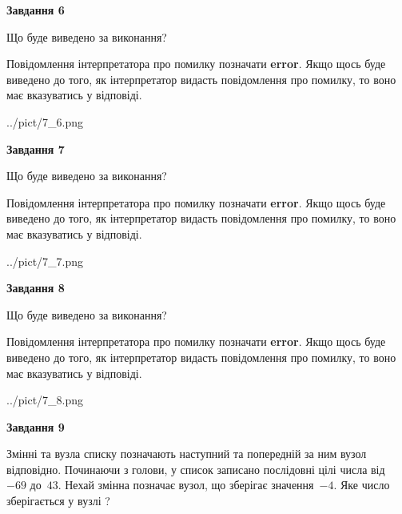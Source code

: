\documentclass[12pt, ukrainian]{article}
\begin{document}
{\begin {large}
{\begin {center}\textbf{Завдання 6}\end {center}}\par
Що буде виведено за виконання?

Повідомлення інтерпретатора про помилку позначати \textbf{error}.
Якщо щось буде виведено до того, як інтерпретатор видасть повідомлення про помилку, 
то воно має вказуватись у відповіді. \par


\begin{center}
	{../pict/7_6.png}
\end{center}
\newpage

{\begin {center}\textbf{Завдання 7}\end {center}}\par
Що буде виведено за виконання?

Повідомлення інтерпретатора про помилку позначати \textbf{error}.
Якщо щось буде виведено до того, як інтерпретатор видасть повідомлення про помилку, 
то воно має вказуватись у відповіді. \par


\begin{center}
	{../pict/7_7.png}
\end{center}
\newpage

{\begin {center}\textbf{Завдання 8}\end {center}}\par
Що буде виведено за виконання?

Повідомлення інтерпретатора про помилку позначати \textbf{error}.
Якщо щось буде виведено до того, як інтерпретатор видасть повідомлення про помилку, 
то воно має вказуватись у відповіді. \par


\begin{center}
	{../pict/7_8.png}
\end{center}
\newpage

{\begin {center}\textbf{Завдання 9}\end {center}}\par
Змінні  та  вузла списку позначають наступний та попередній за ним вузол відповідно. Починаючи з голови, у список записано послідовні цілі числа від~$-69$ до~$43$. Нехай змінна  позначає вузол, що зберігає значення~$-4$.
Яке число зберігається у вузлі  ?\par
\newpage


\end{large}}
\end{document}
